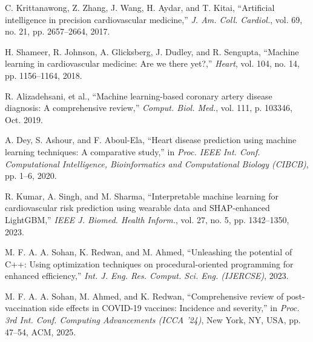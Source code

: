 \documentclass[conference]{IEEEtran}
\begin{document}
\begin{thebibliography}{00}
 C. Krittanawong, Z. Zhang, J. Wang, H. Aydar, and T. Kitai, ``Artificial intelligence in precision cardiovascular medicine,'' \emph{J. Am. Coll. Cardiol.}, vol. 69, no. 21, pp. 2657--2664, 2017.

 H. Shameer, R. Johnson, A. Glicksberg, J. Dudley, and R. Sengupta, ``Machine learning in cardiovascular medicine: Are we there yet?,'' \emph{Heart}, vol. 104, no. 14, pp. 1156--1164, 2018.

 R. Alizadehsani, et al., ``Machine learning-based coronary artery disease diagnosis: A comprehensive review,'' \emph{Comput. Biol. Med.}, vol. 111, p. 103346, Oct. 2019.

 A. Dey, S. Ashour, and F. Aboul-Ela, ``Heart disease prediction using machine learning techniques: A comparative study,'' in \emph{Proc. IEEE Int. Conf. Computational Intelligence, Bioinformatics and Computational Biology (CIBCB)}, pp. 1--6, 2020.

 R. Kumar, A. Singh, and M. Sharma, ``Interpretable machine learning for cardiovascular risk prediction using wearable data and SHAP-enhanced LightGBM,'' \emph{IEEE J. Biomed. Health Inform.}, vol. 27, no. 5, pp. 1342--1350, 2023.

 M. F. A. A. Sohan, K. Redwan, and M. Ahmed, ``Unleashing the potential of C++: Using optimization techniques on procedural-oriented programming for enhanced efficiency,'' \emph{Int. J. Eng. Res. Comput. Sci. Eng. (IJERCSE)}, 2023.

 M. F. A. A. Sohan, M. Ahmed, and K. Redwan, ``Comprehensive review of post-vaccination side effects in COVID-19 vaccines: Incidence and severity,'' in \emph{Proc. 3rd Int. Conf. Computing Advancements (ICCA ’24)}, New York, NY, USA, pp. 47--54, ACM, 2025.

\end{thebibliography}
\end{document}
